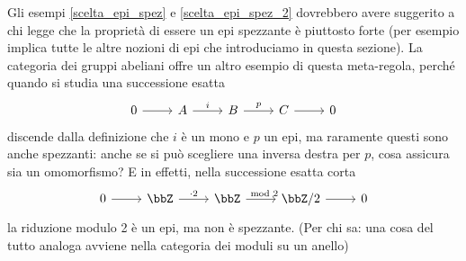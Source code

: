 \begin{remark}
 Gli esempi \ref{scelta_epi_spez} e \ref{scelta_epi_spez_2} dovrebbero avere suggerito a chi legge che la proprietà di essere un epi spezzante è piuttosto forte (per esempio implica tutte le altre nozioni di epi che introduciamo in questa sezione). La categoria dei gruppi abeliani offre un altro esempio di questa meta-regola, perché quando si studia una successione esatta
 \[\begin{tikzcd}[ampersand replacement=\&]
   0 \& A \& B \& C \& 0
   \arrow[from=1-1, to=1-2]
   \arrow[from=1-2, to=1-3, "i"]
   \arrow[from=1-3, to=1-4, "p"]
   \arrow[from=1-4, to=1-5]
  \end{tikzcd}\]
 discende dalla definizione che \(i\) è un mono e \(p\) un epi, ma raramente questi sono anche spezzanti: anche se si può scegliere una inversa destra per \(p\), cosa assicura sia un omomorfismo? E in effetti, nella successione esatta corta
 \[\begin{tikzcd}[ampersand replacement=\&]
   0 \& \bbZ \& \bbZ \& {\bbZ/2} \& 0
   \arrow[from=1-1, to=1-2]
   \arrow["{\cdot 2}", from=1-2, to=1-3]
   \arrow["{\mod 2}", from=1-3, to=1-4]
   \arrow[from=1-4, to=1-5]
  \end{tikzcd}\]
 la riduzione modulo 2 è un epi, ma non è spezzante.
 (Per chi sa: una cosa del tutto analoga avviene nella categoria dei moduli su un anello)
\end{remark}
